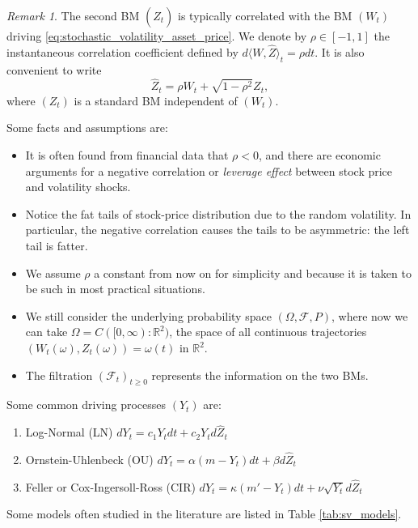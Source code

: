 \documentclass[a4paper,12pt]{article}
\numberwithin{equation}{section}
\theoremstyle{definition}
\theoremstyle{remark}
\newtheorem{remark}{Remark}[section]
\begin{document}
\begin{remark}
The second BM $(\hat{Z}_{t})$ is typically correlated with the BM 
$(W_{t})$ driving \eqref{eq:stochastic_volatility_asset_price}. We 
denote by $\rho\in[-1,1]$ the instantaneous correlation coefficient 
defined by $d\langle W,\hat{Z}\rangle_{t}=\rho dt$. It is also 
convenient to write 
\begin{equation}
\label{eq:bm_relationship}
    \hat{Z}_{t}=\rho W_{t}+\sqrt{1-\rho^{2}}Z_{t},
\end{equation}
where $(Z_{t})$ is a standard BM independent of $(W_{t})$.
\end{remark}
Some facts and assumptions are: 
\begin{itemize}
    \item It is often found from financial data that $\rho<0$, and there are 
    economic arguments for a negative correlation or \textit{leverage effect} 
    between stock price and volatility shocks.
    \item Notice the fat tails of stock-price distribution due to the 
    random volatility. In particular, the negative correlation causes 
    the tails to be asymmetric: the left tail is fatter.
    \item We assume $\rho$ a constant from now on for simplicity 
    and because it is taken to be such in most practical situations.
    \item We still consider the underlying probability space 
    $(\Omega,\mathcal{F},P)$, where now we can take 
    $\Omega=C([0,\infty):\mathbb{R}^{2})$, the space of all continuous 
    trajectories $(W_{t}(\omega),Z_{t}(\omega))=\omega(t)$ in $\mathbb{R}^{2}$.
    \item The filtration $(\mathcal{F}_{t})_{t\geq 0}$ represents the information 
    on the two BMs.
\end{itemize}
Some common driving processes $(Y_{t})$ are: 
\begin{enumerate}
    \item Log-Normal (LN) $dY_{t}=c_{1}Y_{t}dt+c_{2}Y_{t}d\hat{Z}_{t}$
    \item Ornstein-Uhlenbeck (OU) $dY_{t}=\alpha(m-Y_{t})dt+\beta d\hat{Z}_{t}$
    \item Feller or Cox-Ingersoll-Ross (CIR) $dY_{t}=\kappa(m'-Y_{t})dt+\nu\sqrt{Y_{t}}d\hat{Z}_{t}$
\end{enumerate}
Some models often studied in the literature are listed in Table 
\ref{tab:sv_models}.
\end{document}
